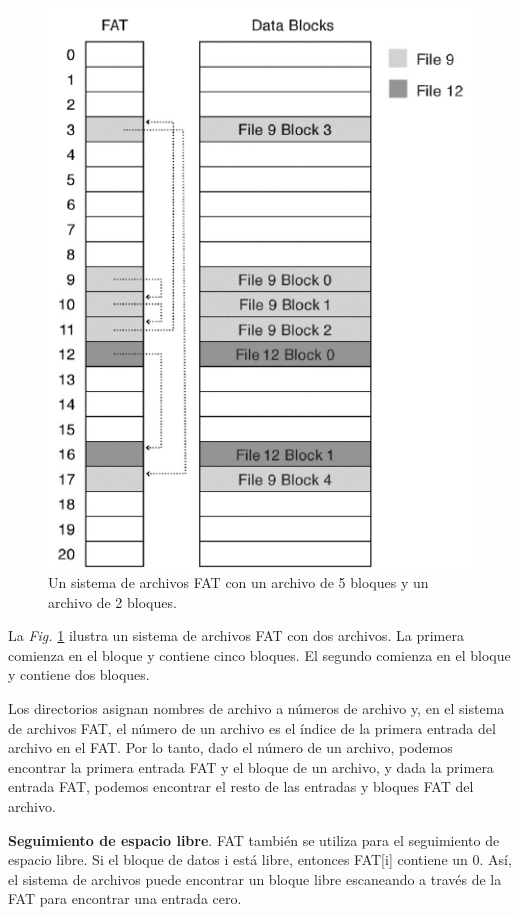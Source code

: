 \documentclass[10pt]{book}
\begin{document}
\begin{figure}[tbhp]
\centerline{\includegraphics[scale=0.65]{img/fig1306}}
\caption{Un sistema de archivos FAT con un archivo de 5 bloques y un archivo de 2 bloques.}
\label{fig1306}
\end{figure}

La \textit{Fig.} \ref{fig1306} ilustra un sistema de archivos FAT con dos archivos. La primera comienza en el bloque {} y contiene cinco bloques. El segundo comienza en el bloque {} y contiene dos bloques.

Los directorios asignan nombres de archivo a números de archivo y, en el sistema de archivos FAT, el número de un archivo es el índice de la primera entrada del archivo en el FAT. Por lo tanto, dado el número de un archivo, podemos encontrar la primera entrada FAT y el bloque de un archivo, y dada la primera entrada FAT, podemos encontrar el resto de las entradas y bloques FAT del archivo.

\textbf{Seguimiento de espacio libre}. FAT también se utiliza para el seguimiento de espacio libre. Si el bloque de datos i está libre, entonces FAT[i] contiene un 0. Así, el sistema de archivos puede encontrar un bloque libre escaneando a través de la FAT para encontrar una entrada cero.
\end{document}
